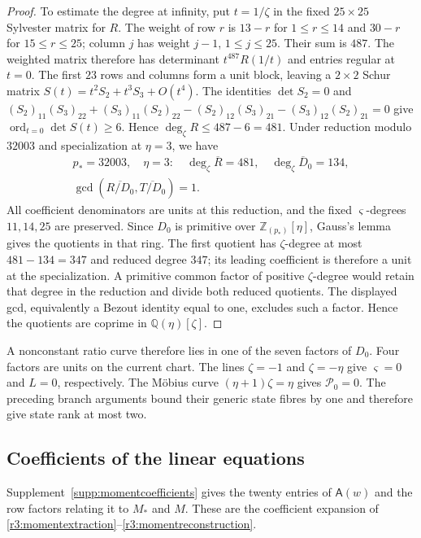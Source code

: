 \documentclass[11pt,a4paper]{article}
\numberwithin{equation}{section}
\theoremstyle{plain}
\theoremstyle{definition}
\theoremstyle{remark}
\begin{document}
\begin{proof}
To estimate the degree at infinity, put $t=1/\zeta$ in the fixed
$25\times25$ Sylvester matrix for $R$.
The weight of row $r$ is $13-r$ for $1\le r\le14$ and $30-r$ for
$15\le r\le25$; column $j$ has weight $j-1$, $1\le j\le25$.
Their sum is $487$. The weighted matrix therefore has determinant
$t^{487}R(1/t)$ and entries regular at $t=0$.
The first $23$ rows and columns form a unit block, leaving a
$2\times2$ Schur matrix
$S(t)=t^2S_2+t^3S_3+O(t^4)$.
The identities $\det S_2=0$ and
$(S_2)_{11}(S_3)_{22}+(S_3)_{11}(S_2)_{22}
-(S_2)_{12}(S_3)_{21}-(S_3)_{12}(S_2)_{21}=0$
give $\operatorname{ord}_{t=0}\det S(t)\ge6$.
Hence $\deg_\zeta R\le487-6=481$.
Under reduction modulo $32003$ and specialization at $\eta=3$,
we have
\begin{equation}\begin{gathered}
p_*=32003,\quad \eta =3:\quad
\deg_\zeta \overline R=481,\quad\deg_\zeta \overline D_0=134,\\
\gcd(\overline{R/D_0},\overline{T/D_0})=1.
\end{gathered}\end{equation}
All coefficient denominators are units at this reduction, and the
fixed $\varsigma$-degrees $11,14,25$ are preserved.
Since $D_0$ is primitive over $\mathbb Z_{(p_*)}[\eta]$, Gauss's lemma
gives the quotients in that ring.
The first quotient has $\zeta$-degree at most $481-134=347$ and
reduced degree $347$; its leading coefficient is therefore a unit
at the specialization.
A primitive common factor of positive $\zeta$-degree would retain
that degree in the reduction and divide both reduced quotients.
The displayed gcd, equivalently a Bezout identity equal to one,
excludes such a factor. Hence the quotients are coprime in
$\mathbb Q(\eta)[\zeta]$.
\end{proof}

A nonconstant ratio curve therefore lies in one of the seven factors
of $D_0$. Four factors are units on the current chart.
The lines $\zeta=-1$ and $\zeta=-\eta$ give $\varsigma=0$ and $L=0$,
respectively. The M\"obius curve $(\eta+1)\zeta=\eta$ gives $\mathcal P_0=0$.
The preceding branch arguments bound their generic state fibres by one
and therefore give state rank at most two.

\subsection{Coefficients of the linear equations}\label{appr3:momentcoefficients}

Supplement~\ref{supp:momentcoefficients} gives the twenty entries of $\mathsf A(w)$
and the row factors relating it to $M_*$ and $M$.
These are the coefficient expansion of
\eqref{r3:momentextraction}--\eqref{r3:momentreconstruction}.
\end{document}
